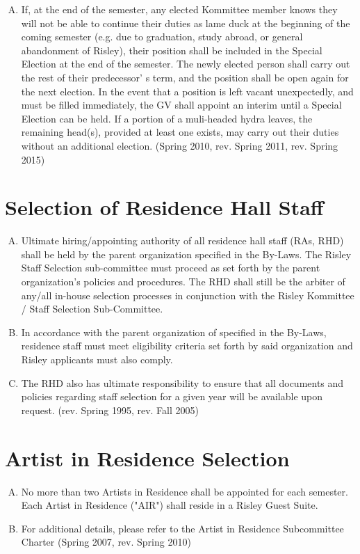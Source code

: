 \documentclass[12pt]{article}
\begin{document}
\begin{enumerate}[A.]
\item If, at the end of the semester, any elected Kommittee member knows they will not be able to continue their duties as lame duck at the beginning of the coming semester (e.g. due to graduation, study abroad, or general abandonment of Risley), their position shall be included in the Special Election at the end of the semester. The newly elected person shall carry out the rest of their predecessor’ s term, and the position shall be open again for the next election. In the event that a position is left vacant unexpectedly, and must be filled immediately, the GV shall appoint an interim until a Special Election can be held. If a portion of a muli-headed hydra leaves, the remaining head(s), provided at least one exists, may carry out their duties without an additional election. (Spring 2010, rev. Spring 2011, rev. Spring 2015)
\end{enumerate}
\section{Selection of Residence Hall Staff}
\begin{enumerate}[A.]
\item Ultimate hiring/appointing authority of all residence hall staff (RAs, RHD) shall be held by the parent organization specified in the By-Laws. The Risley Staff Selection sub-committee must proceed as set forth by the parent organization's policies and procedures. The RHD shall still be the arbiter of any/all in-house selection processes in conjunction with the Risley Kommittee / Staff Selection Sub-Committee.
\item In accordance with the parent organization of specified in the By-Laws, residence staff must meet eligibility criteria set forth by said organization and Risley applicants must also comply.
\item The RHD also has ultimate responsibility to ensure that all documents and policies regarding staff selection for a given year will be available upon request. (rev. Spring 1995, rev. Fall 2005)
\end{enumerate}
\section{Artist in Residence Selection}
\begin{enumerate}[A.]
\item No more than two Artists in Residence shall be appointed for each semester. Each Artist in Residence ("AIR") shall reside in a Risley Guest Suite.
\item For additional details, please refer to the Artist in Residence Subcommittee Charter (Spring 2007, rev. Spring 2010)
\end{enumerate}
\end{document}
